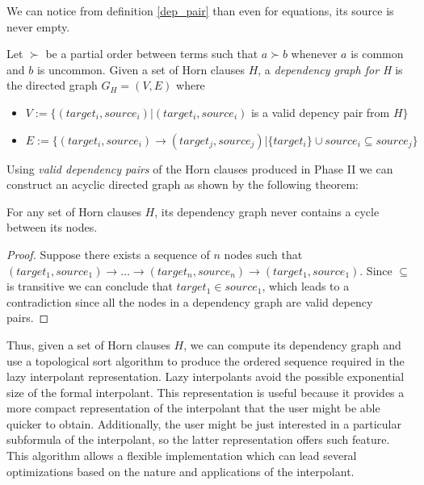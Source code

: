 We can notice from definition \ref{dep_pair} than even for 
equations, its source is never empty. 

\begin{definition}\label{dep_graph}
  Let $\succ$ be a partial order between terms 
  such that $a \succ b$ whenever 
  $a$ is common and $b$ is uncommon. Given a set of 
  Horn clauses $H$, a \emph{dependency graph for H}
  is the directed graph $G_H = (V, E)$ where
  \begin{itemize}
    \item $V := \{(target_i, source_i) | (target_i, source_i)$ 
      is a valid depency pair from $H \}$
    \item $E := \{(target_i, source_i) \rightarrow (target_j, source_j) | 
        \{target_i\} \cup source_i \subseteq source_j
      \}$ 
  \end{itemize}
\end{definition}

Using \emph{valid dependency pairs} of the Horn clauses 
produced in Phase II
we can construct an acyclic directed graph as shown 
by the following theorem:

\begin{theorem}
  For any set of Horn clauses $H$, its dependency graph 
  never contains a cycle between its nodes.
\end{theorem}

\begin{proof}
  Suppose there exists a sequence of $n$ nodes such that 
  $(target_1, source_1) \rightarrow \dots 
  \rightarrow (target_n, source_n) \rightarrow (target_1, source_1)$.
  Since $\subseteq$ is transitive we can conclude that 
  $target_1 \in source_1$, which leads to a contradiction since all
  the nodes in a dependency graph are valid depency pairs.
\end{proof}

Thus, given a set of Horn clauses $H$, we can compute its
dependency graph and use a topological sort algorithm to 
produce the ordered sequence required in the lazy interpolant
representation. Lazy interpolants avoid the 
possible exponential size of the 
formal interpolant. This representation 
is useful because it provides a more compact
representation of the interpolant that the user 
might be able quicker to obtain.
Additionally, the user might be just 
interested in a particular subformula of 
the interpolant, so the
latter representation offers such feature. This algorithm 
allows a flexible implementation 
which can lead several optimizations
based on the nature and applications of the 
interpolant.

